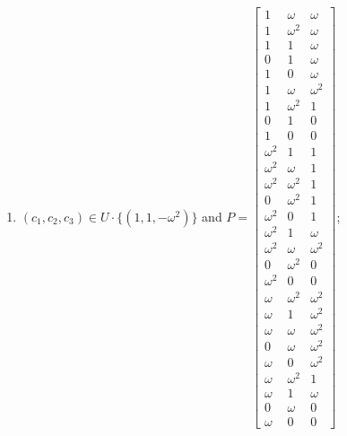 \begin{enumerate}
\item[(f98)\,\newitem] $(c_1,c_2,c_3)\in U\cdot\{(1,1,-\omega^2)\}$ and $P=\begin{bmatrix}1&\omega&\omega\\1&\omega^2&\omega\\1&1&\omega\\0&1&\omega\\1&0&\omega\\1&\omega&\omega^2\\1&\omega^2&1\\0&1&0\\1&0&0\\\omega^2&1&1\\\omega^2&\omega&1\\\omega^2&\omega^2&1\\0&\omega^2&1\\\omega^2&0&1\\\omega^2&1&\omega\\\omega^2&\omega&\omega^2\\0&\omega^2&0\\\omega^2&0&0\\\omega&\omega^2&\omega^2\\\omega&1&\omega^2\\\omega&\omega&\omega^2\\0&\omega&\omega^2\\\omega&0&\omega^2\\\omega&\omega^2&1\\\omega&1&\omega\\0&\omega&0\\\omega&0&0\end{bmatrix}$;
\end{enumerate}
